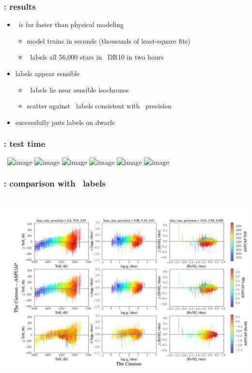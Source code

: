 \documentclass[pdftex]{beamer}
\begin{document}
\newcommand{\results}{%
\begin{frame}
  \frametitle{\tc: results}
  \begin{itemize}
  \item \tc\ is far faster than physical modeling
    \begin{itemize}
    \item model trains in seconds (thousands of least-square fits)
    \item \tc\ labels all 56,000 stars in \apogee\ DR10 in two hours
    \end{itemize}
  \item labels appear sensible
    \begin{itemize}
    \item \tc\ labels lie near sensible isochrones
    \item scatter against \apogee\ labels consistent with \apogee\ precision
    \end{itemize}
  \item successfully puts labels on dwarfs
  \end{itemize}
\end{frame}}

\results

\begin{frame}
  \frametitle{\tc: test time}
  ~\hfill\includegraphics<1>[height=\figureheight]{../documents/plots/4431_v19.png}
         \includegraphics<2>[height=\figureheight]{../documents/plots/4383_v19.png}
         \includegraphics<3>[height=\figureheight]{../documents/plots/4399_v19.png}
         \includegraphics<4>[height=\figureheight]{../documents/plots/4309_v19.png}
         \includegraphics<5>[height=\figureheight]{../documents/plots/4311_v19.png}
         \includegraphics<6>[height=\figureheight]{../documents/plots/4255_v19.png} 
\end{frame}

\begin{frame}
  \frametitle{\tc: comparison with \apogee\ labels}
  ~\hfill\includegraphics[height=\figureheight]{../documents/plots/cplot2.png} 
\end{frame}
\end{document}
